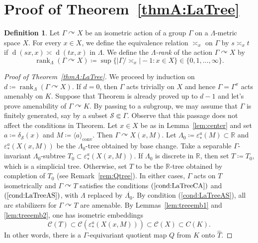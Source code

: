 \documentclass[12pt,nosumlimits,nonamelimits]{amsart}
\theoremstyle{remark}
\theoremstyle{definition}
\newtheorem{defn}[thm]{Definition}
\newcommand{\IR}{\mathbb{R}}
\newcommand{\cC}{\mathcal{C}}
\newcommand{\cS}{\mathcal{S}}
\newcommand{\ve}{\varepsilon}
\newcommand{\Ga}{\Gamma}
\newcommand{\La}{\Lambda}
\newcommand{\acts}{\curvearrowright}
\DeclareMathOperator{\rank}{rank}
\DeclareMathOperator{\dist}{d}
\DeclareMathOperator{\conv}{conv}
\newcommand{\ip}[1]{\mathopen{\langle}#1\mathclose{\rangle}}
\begin{document}
\section{Proof of Theorem~\ref{thmA:LaTree}}
%
%
\begin{defn}
Let $\Ga\acts X$ be an isometric action 
of a group $\Ga$ on a $\La$-metric space $X$.
For every $x\in X$, we define the equivalence 
relation $\asymp_x$ on $\Ga$ by $s\asymp_x t$ if 
$\dist(sx,x) \asymp \dist(tx,x)$ in $\La$. 
We define the \emph{$\La$-rank} of 
the action $\Ga\acts X$ by 
\[
\rank_\La(\Ga\acts X)
 \coloneq \sup\{ | \Ga/{\asymp_x} | -1 : x\in X\}
 \in \{0,1,\ldots,\infty\}.
\]
\end{defn}
%
\begin{proof}[Proof of Theorem~\ref{thmA:LaTree}]
We proceed by induction on $d \coloneq \rank_\La(\Ga\acts X)$. 
If $d=0$, then $\Ga$ acts trivially on $X$ and hence $\Ga=\Ga^x$ 
acts amenably on $K$. 
Suppose that Theorem is already proved up to $d-1$ and let's prove 
amenability of $\Ga\acts K$. 
By passing to a subgroup, we may assume that $\Ga$ is finitely generated, 
say by a subset $\cS\Subset\Ga$. 
Observe that this passage does not affect 
the conditions in Theorem. 
Let $x\in X$ be as in Lemma~\ref{lem:center} 
and set $a\coloneq\delta_{\cS}(x)$ and $M \coloneq \ip{a}_{\conv}$. 
Then $\Ga \acts X(x,M)$. 
Let $\La_0 \coloneq \ve_*^a(M) \subset\IR$ and 
$\ve_*^a(X(x,M))$ be 
the $\La_0$-tree obtained by base change. 
Take a separable $\Ga$-invariant $\La_0$-subtree 
$T_0\subset \ve_*^a(X(x,M))$. 
If $\La_0$ is discrete in $\IR$, then set $T \coloneq T_0$, which is a simplicial tree.
Otherwise, set $T$ to be the $\IR$-tree obtained 
by completion of $T_0$ 
(see Remark~\ref{rem:Qtree}). 
In either cases, $\Ga$ acts on $T$ isometrically and 
$\Ga\acts T$ satisfies the conditions 
$(\ref{cond:LaTreeCA})$ and $(\ref{cond:LaTreeAS})$, 
with $\La$ replaced by $\overline{\Lambda_0}$. 
By condition (\ref{cond:LaTreeAS}), all arc stabilizers for $\Ga\acts T$ are amenable. 
By Lemmas~\ref{lem:treeemb1} and \ref{lem:treeemb2}, 
one has isometric embeddings 
\[
\cC(T)\subset\cC( \ve_*^a(X(x,M))) \subset \cC(X)\subset C(K).
\]
In other words, there is a $\Ga$-equivariant quotient 
map $Q$ from $K$ onto $\hat{T}$. 


\end{proof}
\end{document}
